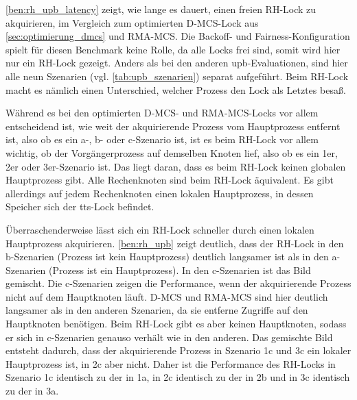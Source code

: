 \autoref{ben:rh_upb_latency} zeigt,
wie lange es dauert,
einen freien RH-Lock zu akquirieren,
im Vergleich zum optimierten D-MCS-Lock aus \autoref{sec:optimierung_dmcs} und RMA-MCS.
Die Backoff- und Fairness-Konfiguration spielt für diesen Benchmark keine Rolle,
da alle Locks frei sind,
somit wird hier nur ein RH-Lock gezeigt.
Anders als bei den anderen \gls{upb}-Evaluationen,
sind hier alle neun Szenarien (vgl. \autoref{tab:upb_szenarien}) separat aufgeführt.
Beim RH-Lock macht es nämlich einen Unterschied,
welcher Prozess den Lock als Letztes besaß.

Während es bei den optimierten D-MCS- und RMA-MCS-Locks vor allem entscheidend ist,
wie weit der akquirierende Prozess vom Hauptprozess entfernt ist,
also ob es ein a-, b- oder c-Szenario ist,
ist es beim RH-Lock vor allem wichtig,
ob der Vorgängerprozess auf demselben Knoten lief,
also ob es ein 1er, 2er oder 3er-Szenario ist.
Das liegt daran,
dass es beim RH-Lock keinen globalen Hauptprozess gibt.
Alle Rechenknoten sind beim RH-Lock äquivalent.
Es gibt allerdings auf jedem Rechenknoten einen lokalen Hauptprozess,
in dessen Speicher sich der \gls{tts}-Lock befindet.

\clearpage

Überraschenderweise lässt sich ein RH-Lock schneller durch einen lokalen Hauptprozess akquirieren.
\autoref{ben:rh_upb} zeigt deutlich,
dass der RH-Lock in den b-Szenarien (Prozess ist kein Hauptprozess) deutlich langsamer ist
als in den a-Szenarien (Prozess ist ein Hauptprozess).
In den c-Szenarien ist das Bild gemischt.
Die c-Szenarien zeigen die Performance,
wenn der akquirierende Prozess nicht auf dem Hauptknoten läuft.
D-MCS und RMA-MCS sind hier deutlich langsamer als in den anderen Szenarien,
da sie entferne Zugriffe auf den Hauptknoten benötigen.
Beim RH-Lock gibt es aber keinen Hauptknoten,
sodass er sich in c-Szenarien genauso verhält
wie in den anderen.
Das gemischte Bild entsteht dadurch,
dass der akquirierende Prozess in Szenario 1c und 3c ein lokaler Hauptprozess ist,
in 2c aber nicht.
Daher ist die Performance des RH-Locks in Szenario 1c identisch zu der in 1a,
in 2c identisch zu der in 2b
und in 3c identisch zu der in 3a.


